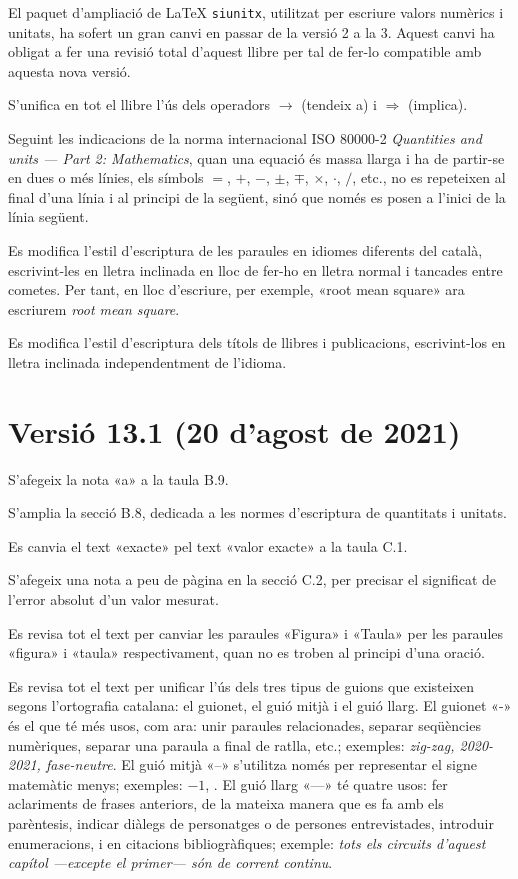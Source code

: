 El paquet d'ampliació de \LaTeX{} \texttt{siunitx}, utilitzat per escriure valors numèrics i unitats, ha sofert un gran canvi en passar de la versió 2 a la 3. Aquest canvi ha obligat a fer una  revisió total d'aquest llibre per tal de fer-lo compatible amb aquesta nova versió. 

S'unifica en tot el llibre l'ús dels operadors $\rightarrow$ (tendeix a) i $\Rightarrow$ (implica).

Seguint les indicacions de la norma internacional ISO 80000-2 \textit{Quantities and units --- Part 2: Mathematics}, quan una equació és massa llarga i ha de partir-se en dues o més línies, els símbols $=$, $+$, $-$, $\pm$, $\mp$, $\times$, $\cdot$, $/$, etc., no es repeteixen al final d'una línia i al principi de la següent, sinó que només es posen a l'inici de la  línia següent.

Es modifica l'estil d'escriptura de les paraules en idiomes diferents del català, escrivint-les en lletra inclinada en lloc de fer-ho en lletra normal i tancades entre cometes. Per tant, en lloc d'escriure, per exemple, «root mean square» ara escriurem \textit{root mean square}.

Es modifica l'estil d'escriptura dels títols de llibres i publicacions, escrivint-los en lletra inclinada independentment de l'idioma.


\section*{Versió 13.1 (20 d'agost de 2021)}

S'afegeix la nota «a» a la taula B.9.

S'amplia la secció B.8, dedicada a les normes d'escriptura de quantitats i unitats.

Es canvia el text «exacte» pel text «valor exacte» a la taula C.1.

S'afegeix una nota a peu de pàgina en la secció C.2, per precisar el significat de l'error absolut d'un valor mesurat.

Es revisa tot el text per canviar les paraules «Figura» i «Taula» per les paraules «figura» i «taula» respectivament, quan no es troben al principi d'una oració.

Es revisa tot el text per unificar l'ús dels tres tipus de guions que existeixen segons l'ortografia catalana: el guionet, el guió mitjà i el guió llarg. El guionet  «-» és el que té més usos, com ara:  unir paraules relacionades, separar seqüències numèriques, separar una paraula a final de ratlla, etc.; exemples: \textit{zig-zag, 2020-2021, fase-neutre}. El guió mitjà  «--» s'utilitza només per representar el signe matemàtic menys; exemples: $-1$, . El  guió llarg  «---» té quatre usos: fer aclariments de frases anteriors, de la mateixa manera que es fa amb els parèntesis, indicar diàlegs de personatges o de persones entrevistades, introduir enumeracions, i en citacions bibliogràfiques; exemple: \textit{tots els circuits d'aquest capítol ---excepte el primer--- són de corrent continu}.


